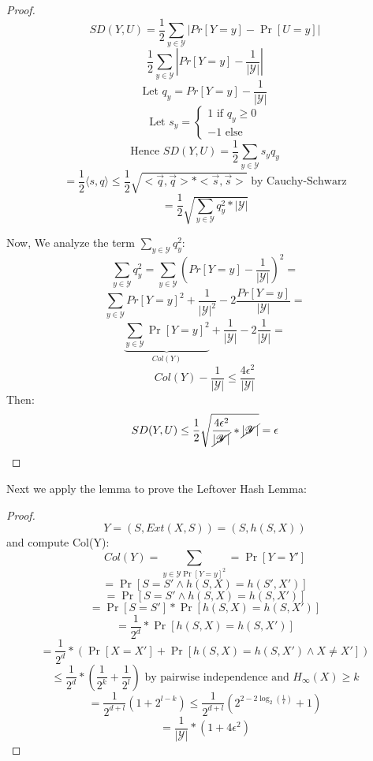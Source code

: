 \documentclass[11pt, a4paper]{article}
\begin{document}
\begin{proof}
    $$SD(Y,U) = \frac{1}{2} \sum_{y \in \mathcal{Y}} |Pr[Y=y] - \Pr[U=y]|$$
    $$\frac{1}{2} \sum_{y \in \mathcal{Y}} |Pr[Y=y] - \frac{1}{|\mathcal{Y}|}|$$
    $$\text{Let } q_y = Pr[Y=y] - \frac{1}{|\mathcal{Y}|}$$
    $$\text{Let } s_y = \begin{cases}
        1 \text{ if } q_y \geq 0\\
        -1 \text{ else}
    \end{cases}$$
    $$\text{Hence } SD(Y,U) = \frac{1}{2} \sum_{y \in \mathcal{Y}} s_y q_y$$
    $$= \frac{1}{2} \langle s,q \rangle \leq \frac{1}{2} \sqrt{<\overrightarrow{q},\overrightarrow{q}> * <\overrightarrow{s},\overrightarrow{s}>} \text{ by Cauchy-Schwarz}$$
    $$ = \frac{1}{2} \sqrt{\sum_{y \in \mathcal{Y}} q_y^2 * |\mathcal{Y}|}$$

Now, We analyze the term $\sum_{y \in \mathcal{Y}} q_y^2$:
$$\sum_{y \in \mathcal{Y}} q_y^2 = \sum_{y \in \mathcal{Y}} (Pr[Y=y] - \frac{1}{|\mathcal{Y}|})^2 =$$
$$\sum_{y \in \mathcal{Y}} Pr[Y=y]^2 + \frac{1}{|\mathcal{Y}|^2} -2\frac{Pr[Y=y]}{|\mathcal{Y}|} =$$
$$ \underbrace{\sum_{y \in \mathcal{Y}} \Pr[Y=y]^2}_{Col(Y)} + \frac{1}{|\mathcal{Y}|} - 2\frac{1}{|\mathcal{Y}|} =$$
$$Col(Y) - \frac{1}{|\mathcal{Y}|} \leq \frac{4\epsilon^2}{|\mathcal{Y}|}$$
Then:
$$SD(Y,U) \leq \frac{1}{2} \sqrt{\frac{4\epsilon^2}{\cancel{|\mathcal{Y}|}} * \cancel{|\mathcal{Y}|}} = \epsilon$$
\end{proof}
Next we apply the lemma to prove the Leftover Hash Lemma:
\begin{proof}
    $$Y = (S,Ext(X,S)) = (S,h(S,X))$$
and compute Col(Y):
$$Col(Y) = \sum_{y \in \mathcal{Y}\Pr[Y=y]^2} = \Pr[Y=Y']$$
$$= \Pr[S=S' \wedge h(S,X) = h(S',X')]$$
$$= \Pr[S=S' \wedge h(S,X) = h(S,X')]$$
$$= \Pr[S=S'] * \Pr[h(S,X) = h(S,X')]$$
$$= \frac{1}{2^d} * \Pr[h(S,X) = h(S,X')]$$
$$ = \frac{1}{2^d} * (\Pr[X=X'] + \Pr[h(S,X) = h(S,X') \wedge X \neq X'])$$
$$ \leq \frac{1}{2^d} * (\frac{1}{2^k} + \frac{1}{2^l}) \text{ by pairwise independence and } H_\infty(X) \geq k$$
$$ = \frac{1}{2^{d+l}}(1 + 2^{l-k}) \leq \frac{1}{2^{d+l}}(2^{2-2\log_2(\frac{1}{\epsilon})}+ 1)$$
$$ = \frac{1}{|\mathcal{Y}|} * (1 + 4\epsilon^2)$$ 
\end{proof}
\end{document}
